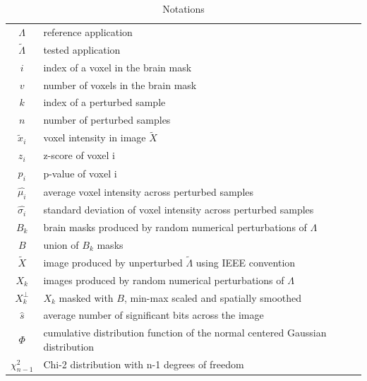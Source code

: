 \documentclass[lettersize,journal]{IEEEtran}
\begin{document}
\begin{table}
    \centering
    \begin{tabular}{c|l}
        $\Lambda$        & reference application                                                         \\
        $\tilde \Lambda$ & tested application                                                            \\
        $i$              & index of a voxel in the brain mask                                            \\
        $v$              & number of voxels in the brain mask                                            \\
        $k$              & index of a perturbed sample                                                 \\
        $n$              & number of perturbed samples                                                 \\
        $\tilde x_i$     & voxel intensity in image $\tilde X$                                           \\
        $z_i$            & z-score of voxel i                                                    \\
        $p_i$            & p-value of voxel i                                                    \\
        $\hat{\mu_i}$    & average voxel intensity across perturbed samples                              \\
        $\hat{\sigma_i}$ & standard deviation of voxel intensity across perturbed samples                \\
        $B_k$            & brain masks produced by random numerical perturbations of $\Lambda$    \\
        $B$              & union of $B_k$ masks                                                          \\
        $\tilde X$       & image produced by unperturbed $\tilde \Lambda$ using IEEE convention          \\
        $X_k$            & images produced by random numerical perturbations of $\Lambda$                          \\
        $X_k^{\perp}$    & $X_k$ masked with $B$, min-max scaled and spatially smoothed                  \\
        $\hat{s}$        & average number of significant bits across the image                           \\
        $\Phi$           & cumulative distribution function of the normal centered Gaussian distribution \\
        $\chi^2_{n-1}$   & Chi-2 distribution with n-1 degrees of freedom                                \\
    \end{tabular}
    \caption{Notations}
    \label{tab:notations}
\end{table}
\end{document}
